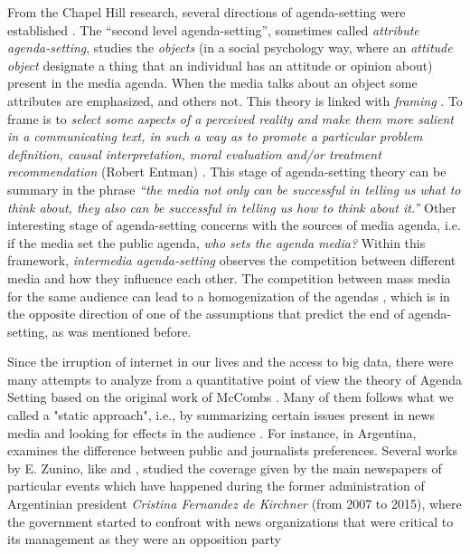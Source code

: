 \documentclass[a4paper, 12pt]{article}
\begin{document}
\par From the Chapel Hill research, several directions of agenda-setting were established \cite{mccombs2005look}.
The ``second level agenda-setting'', sometimes called \textit{attribute agenda-setting}, studies the \textit{objects} (in a social psychology way, where an \textit{attitude object} designate a thing that an individual has an attitude or opinion about) present in the media agenda. When the media talks about an object some attributes are emphasized, and others not. 
This theory is linked with \textit{framing} \cite{guggenheim2015dynamics, tsur2015frame}. 
To frame is to \textit{select some aspects of a perceived reality and make them more salient in a communicating text, in such a way as to promote a particular problem definition, causal interpretation, moral evaluation and/or treatment recommendation} (Robert Entman) \cite{mccombs2005look}.
This stage of agenda-setting theory can be summary in the phrase \textit{``the media not only can be successful in telling us what to think about, they also can be successful in telling us how to think about it.''} 
Other interesting stage of agenda-setting concerns with the sources of media agenda, i.e. if the media set the public agenda, \textit{who sets the agenda media?} Within this framework, \textit{intermedia agenda-setting} observes the competition between different media and how they influence each other. The competition between mass media for the same audience can lead to a homogenization of the agendas \cite{vargo2017networks}, which is in the opposite direction of one of the assumptions that predict the end of agenda-setting, as was mentioned before.


\par Since the irruption of internet in our lives and the access to big data, there were many attempts to analyze from a quantitative point of view the theory of Agenda Setting based on  the original work of McCombs \cite{mccombs1972agenda}. Many of them follows what we called a "static approach", i.e., by summarizing certain issues present in news media and looking for effects in the audience \cite{brians1996campaign, gerber2009does, coleman2007young}.
For instance, in Argentina, \cite{mitchelstein2016brecha} examines the difference between public and journalists preferences. 
Several works by E. Zunino, like \cite{zunino2010cobertura} and \cite{koziner2013cobertura}, studied the coverage given by the main newspapers of particular events which have happened during the former administration of Argentinian president \emph{Cristina Fernandez de Kirchner} (from 2007 to 2015), where the government started to confront with news organizations that were critical to its management as they were an opposition party \cite{mitchelstein2017information}
\end{document}
